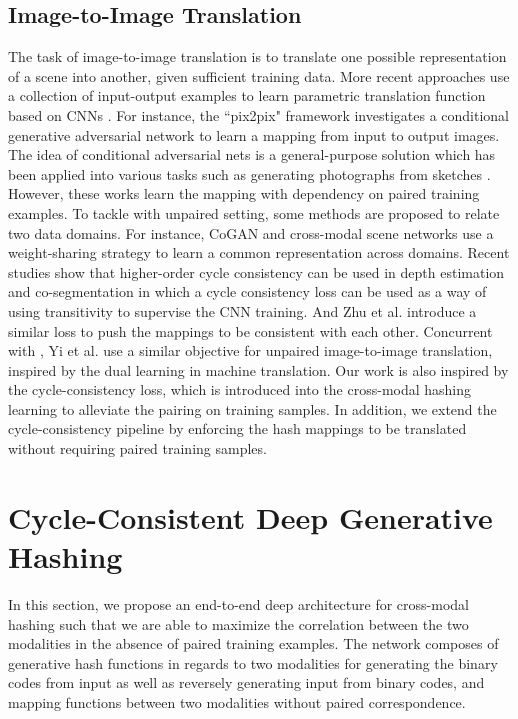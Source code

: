 \documentclass[10pt,journal,twocolumn]{IEEEtran}
\begin{document}
\subsection{Image-to-Image Translation}

The task of image-to-image translation is to translate one possible representation of a
scene into another, given sufficient training data. More recent approaches use a collection of input-output examples to learn parametric translation function based on CNNs \cite{Fully-CNN}. For instance, the ``pix2pix" framework \cite{Pix2Pix} investigates a conditional generative adversarial network to learn a mapping from input to output images. The idea of conditional adversarial nets is a general-purpose solution which has been applied into various tasks such as generating photographs from sketches \cite{Scribbler}. However, these works learn the mapping with dependency on paired training examples. To tackle with unpaired setting, some methods are proposed to relate two data domains. For instance, CoGAN \cite{Coupled-GAN} and cross-modal scene networks \cite{Cross-scene-network} use a weight-sharing strategy to learn a common representation across domains. Recent studies show that higher-order cycle consistency can be used in depth estimation \cite{Depth-left-right} and co-segmentation \cite{co-segmentation-consistent} in which a cycle consistency loss can be used as a way of using transitivity to supervise the CNN training. And Zhu et al. \cite{CycleGAN} introduce a similar loss to push the mappings to be consistent with each other. Concurrent with \cite{CycleGAN}, Yi et al. \cite{Dual-GAN} use a similar objective for unpaired image-to-image translation, inspired by the dual learning in machine translation. Our work is also inspired by the cycle-consistency loss, which is introduced into the cross-modal hashing learning to alleviate the pairing on training samples. In addition, we extend the cycle-consistency pipeline by enforcing the hash mappings to be translated without requiring paired training samples.
\section{Cycle-Consistent Deep Generative Hashing}\label{sec:approach}


In this section, we propose an end-to-end deep architecture for cross-modal hashing such that we are able to maximize the correlation between the two modalities in the absence of paired training examples. The network composes of generative hash functions in regards to two modalities for generating the binary codes from input as well as reversely generating input from binary codes, and mapping functions between two modalities without paired correspondence.
\end{document}

